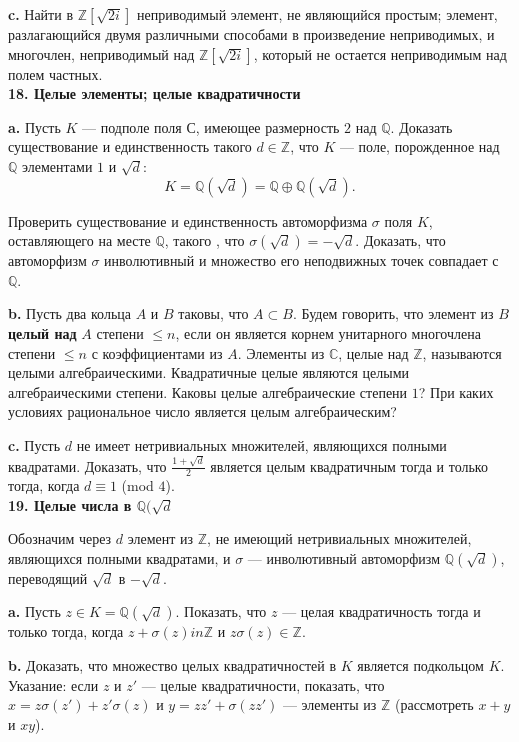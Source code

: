\documentclass{mai_book}
\begin{document}
\textbf{c.} Найти в $\mathbb{Z}[\sqrt{2i}]$ неприводимый элемент, не являющийся простым; элемент, разлагающийся двумя различными способами в произведение неприводимых, и многочлен, неприводимый над $\mathbb{Z}[\sqrt{2i}]$, который не остается неприводимым над полем частных.
\\

\noindent \textbf{18. Целые элементы; целые квадратичности}

\textbf{a.} Пусть $K$ — подполе поля $\mathbb{С}$, имеющее размерность $2$ над $\mathbb{Q}$. Доказать существование и единственность такого $d \in \mathbb{Z}$, что $K$ — поле,
порожденное над $\mathbb{Q}$ элементами $1$ и $\sqrt{d}$:
\[
K = \mathbb{Q}(\sqrt{d}) = \mathbb{Q} \oplus \mathbb{Q}(\sqrt{d}).
\]

\noindent Проверить существование и единственность автоморфизма $\sigma$ поля $K$,
оставляющего на месте $\mathbb{Q}$, такого , что $\sigma (\sqrt{d}) = -\sqrt{d}$. Доказать, что автоморфизм $\sigma$ инволютивный и множество его неподвижных точек совпадает с $\mathbb{Q}$.

\textbf{b.} Пусть два кольца $A$ и $B$ таковы, что $A \subset B$. Будем говорить, что элемент из $B$ \textbf{целый над} $A$ степени $\le n$, если он является корнем унитарного многочлена степени $\le n$ с коэффициентами из $A$. Элементы из $\mathbb{C}$, целые над $\mathbb{Z}$, называются целыми алгебраическими. Квадратичные целые являются целыми алгебраическими степени. Каковы целые алгебраические степени $1$? При каких условиях рациональное число является целым алгебраическим?

\textbf{c.} Пусть $d$ не имеет нетривиальных множителей, являющихся полными квадратами. Доказать, что $\frac{1+\sqrt{d}}{2}$ является целым 
квадратичным тогда и только тогда, когда $d \equiv 1$ (mod $4$).
\\

\noindent \textbf{19. Целые числа в $\mathbb{Q}(\sqrt{d}$}

Обозначим через $d$ элемент из $\mathbb{Z}$, не имеющий нетривиальных 
множителей, являющихся полными квадратами, и $\sigma$ — инволютивный 
автоморфизм $\mathbb{Q}(\sqrt{d})$, переводящий $\sqrt{d}$ в $- \sqrt{d}$.

\textbf{a.} Пусть $z \in K = \mathbb{Q}(\sqrt{d})$. Показать, что $z$ — целая квадратичность тогда и только тогда, когда $z+\sigma (z)in \mathbb{Z}$ и $z\sigma (z) \in \mathbb{Z}$.

\textbf{b.} Доказать, что множество целых квадратичностей в $K$ 
является подкольцом $K$. Указание: если $z$ и $z'$ — целые квадратичности, 
показать, что $x=z\sigma(z')+z'\sigma(z)$ и $y=zz'+\sigma(zz')$ — элементы из $\mathbb{Z}$ (рассмотреть $x + y$ и $xy$).
\end{document}

